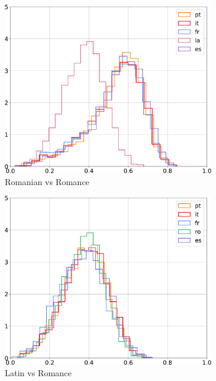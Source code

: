 \documentclass[output=paper]{langsci/langscibook}
\begin{document}
\begin{figure}[!ht]
\begin{subfigure}{0.30\textwidth}
        \includegraphics[width=\linewidth]{figures/UBAN_histogram_distances_ro_all_contour.pdf}
        \caption{Romanian vs Romance}
    \end{subfigure}
    \begin{subfigure}{0.30\textwidth}
        \includegraphics[width=\linewidth]{figures/UBAN_histogram_distances_la_all_contour.pdf}
        \caption{Latin vs Romance}
    \end{subfigure}
    \begin{subfigure}{0.30\textwidth}

\end{subfigure}
\end{figure}
\end{document}
